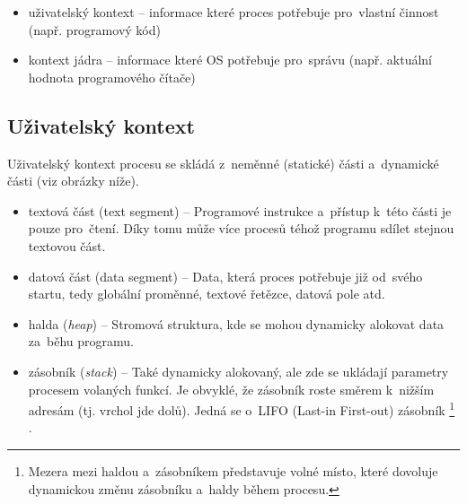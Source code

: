\begin{itemize}[noitemsep]
	\item uživatelský kontext -- informace které proces potřebuje pro~vlastní činnost (např. programový kód)
	\item kontext jádra -- informace které OS potřebuje pro~správu (např. aktuální hodnota programového čítače)
\end{itemize}

\subsection{Uživatelský kontext}

Uživatelský kontext procesu se skládá z~neměnné (statické) části a~dynamické části (viz obrázky níže).

\begin{itemize}[noitemsep]
	\item textová část (text segment) -- Programové instrukce a~přístup k~této části je pouze pro~čtení. Díky tomu může více procesů téhož programu sdílet stejnou textovou část.
	\item datová část (data segment) -- Data, která proces potřebuje již od~svého startu, tedy globální proměnné, textové řetězce, datová pole atd. 
	\item halda (\emph{heap}) -- Stromová struktura, kde se mohou dynamicky alokovat data za~běhu programu.
	\item zásobník (\emph{stack}) -- Také dynamicky alokovaný, ale zde se ukládají parametry procesem volaných funkcí. Je obvyklé, že zásobník roste směrem k~nižším adresám (tj. vrchol jde dolů). Jedná se o~LIFO (Last-in First-out) zásobník%
	\footnote{Mezera mezi haldou a~zásobníkem představuje volné místo, které dovoluje dynamickou změnu zásobníku a~haldy během procesu.}%
	.
\end{itemize}

